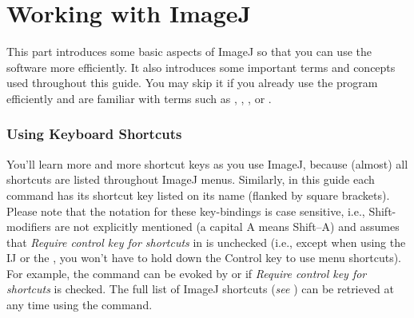 
\part{Working with ImageJ\label{part:Working-with-ImageJ}}

This part introduces some basic aspects of ImageJ so that you can
use the software more efficiently. It also introduces some important
terms and concepts used throughout this guide. You may skip it if
you already use the program efficiently and are familiar with terms
such as , ,
, 
or .


\section{Using Keyboard Shortcuts\label{sub:Using-Shortcuts}}

You'll learn more and more shortcut
keys as you use ImageJ, because (almost) all shortcuts are listed
throughout ImageJ menus. Similarly, in this guide each command has
its shortcut key listed on its name (flanked by square brackets).
Please note that the notation for these key-bindings is case sensitive,
i.e., Shift-modifiers are not explicitly mentioned (a capital \textsf{A}
means \textsf{Shift--A}) and assumes that \emph{Require control key
for shortcuts }in \textsf{}
is unchecked (i.e., except when using the IJ 
or the , you won't have to hold down the Control
key to use menu shortcuts). For example, the command \textsf{}
can be evoked by   or 
  if \emph{Require control key
for shortcuts }is checked. The full list of ImageJ shortcuts (\emph{see}
) can be retrieved at any time using
the \textsf{}
command.

